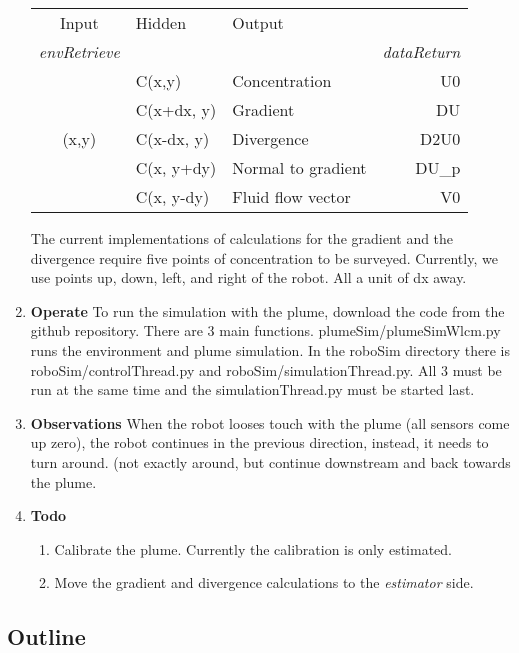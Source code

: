 \documentclass[11pt]{article} %
\begin{document}
\begin{enumerate}
\begin{tabular}{ c| l| l |r}
  Input& Hidden & Output&  \\

{\it envRetrieve}&&&{\it dataReturn} \\\hline
                     & C(x,y)         & Concentration  & U0 \\
                     & C(x+dx, y) & Gradient & DU\\
     (x,y)        & C(x-dx, y) &Divergence  & D2U0  \\
                     & C(x, y+dy) & Normal to gradient & DU\_p\\
                     & C(x, y-dy) & Fluid flow vector & V0 \\
\end{tabular}



The current implementations of calculations for the gradient and the divergence require five points of concentration to be surveyed.  Currently, we use points up, down, left, and right of the robot.  All a unit of dx away.  

\item{\bf Operate}
To run the simulation with the plume, download the code from the github repository.  There are 3 main functions.  plumeSim/plumeSimWlcm.py  runs the environment and plume simulation.  In the roboSim directory there is roboSim/controlThread.py and roboSim/simulationThread.py.    All 3 must be run at the same time and the simulationThread.py must be started last.  

\item{\bf Observations}
When the robot looses touch with the plume (all sensors come up zero), the robot continues in the previous direction, instead, it needs to turn around.  (not exactly around, but continue downstream and back towards the plume.

\item {\bf Todo}
\begin{enumerate}
\item Calibrate the plume.  Currently the calibration is only estimated. 
\item Move the gradient and divergence calculations to the {\it estimator} side.
\end{enumerate}


\end{enumerate}






\subsection{Outline}
\end{document}

